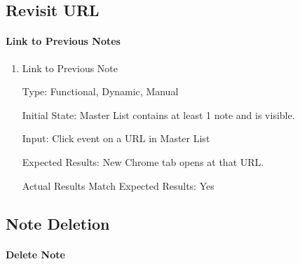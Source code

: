 \documentclass[12pt, titlepage]{article}
\begin{document}
\subsection{Revisit URL}

\paragraph{Link to Previous Notes}

\begin{enumerate}
	
	\item{Link to Previous Note\\}
	
	Type: Functional, Dynamic, Manual
	
	Initial State: Master List contains at least 1 note and is visible. 
	
	Input: Click event on a URL in Master List
	
	Expected Results: New Chrome tab opens at that URL.
	
	Actual Results Match Expected Results: Yes
	
\end{enumerate}

\subsection{Note Deletion}

\paragraph{Delete Note}
\end{document}

